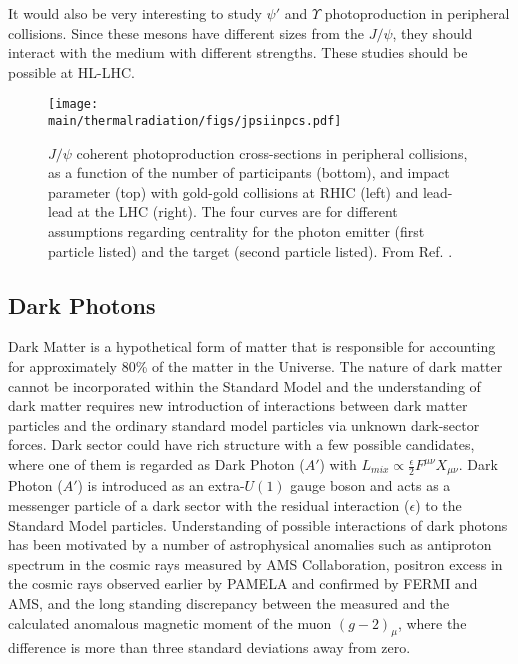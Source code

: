 \documentclass[../report.tex]{subfiles}
\providecommand{\main}{..}
\begin{document}
It would also be very interesting to study $\psi'$ and $\Upsilon$ photoproduction in peripheral collisions.  Since these mesons have different sizes from the $J/\psi$, they should interact with the medium with different strengths.  These studies should be possible at HL-LHC.  

\begin{figure}[htb]
\centering
\texttt{[image: \\main/thermalradiation/figs/jpsiinpcs.pdf]}
\caption{$J/\psi$ coherent photoproduction cross-sections in peripheral collisions, as a function of the number of participants (bottom), and impact parameter (top) with gold-gold collisions at RHIC (left) and lead-lead at the LHC (right).  The four curves are for different assumptions regarding centrality for the photon emitter (first particle listed) and the target (second particle listed).  From Ref. \cite{Zha:2017jch}.}
\label{fig:jpsiinpcs} 
\end{figure}


\newpage
\subsection{Dark Photons }
\label{dileptons:darkphotons}

Dark Matter is a hypothetical form of matter that is responsible for accounting for approximately 80\% of the matter in the Universe.  
The nature of dark matter cannot be incorporated within the Standard Model 
and the understanding of dark matter requires new introduction of interactions between dark matter particles 
and the ordinary standard model particles via unknown dark-sector forces. 
Dark sector could have rich structure with a few possible candidates, 
where one of them is regarded as Dark Photon ($A'$) with 
$L_{mix} \propto\frac{\epsilon}{2}F^{\mu\nu}X_{\mu\nu}$.
Dark Photon ($A'$) is introduced as an extra-$U(1)$ gauge boson and acts as a messenger particle of a dark sector 
with the residual interaction ($\epsilon$) to the Standard Model particles.
Understanding of possible interactions of dark photons has been motivated by 
a number of astrophysical anomalies such as antiproton spectrum in 
the cosmic rays measured by AMS Collaboration,
positron excess in the cosmic rays observed earlier by PAMELA 
and confirmed by FERMI and AMS, 
and the long standing discrepancy
between the measured and the calculated anomalous magnetic moment of 
the muon $(g-2)_{\mu}$, where
the difference is more than three standard deviations away from zero.
\end{document}
